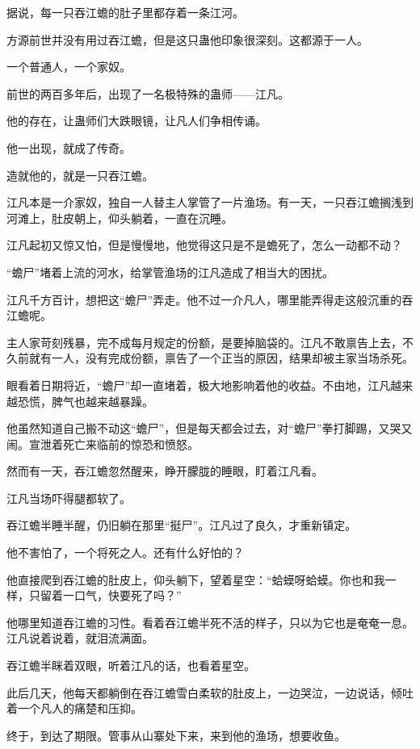 
\begin{this_body}

据说，每一只吞江蟾的肚子里都存着一条江河。

方源前世并没有用过吞江蟾，但是这只蛊他印象很深刻。这都源于一人。

一个普通人，一个家奴。

前世的两百多年后，出现了一名极特殊的蛊师——江凡。

他的存在，让蛊师们大跌眼镜，让凡人们争相传诵。

他一出现，就成了传奇。

造就他的，就是一只吞江蟾。

江凡本是一介家奴，独自一人替主人掌管了一片渔场。有一天，一只吞江蟾搁浅到河滩上，肚皮朝上，仰头躺着，一直在沉睡。

江凡起初又惊又怕，但是慢慢地，他觉得这只是不是蟾死了，怎么一动都不动？

“蟾尸”堵着上流的河水，给掌管渔场的江凡造成了相当大的困扰。

江凡千方百计，想把这“蟾尸”弄走。他不过一介凡人，哪里能弄得走这般沉重的吞江蟾呢。

主人家苛刻残暴，完不成每月规定的份额，是要掉脑袋的。江凡不敢禀告上去，不久前就有一人，没有完成份额，禀告了一个正当的原因，结果却被主家当场杀死。

眼看着日期将近，“蟾尸”却一直堵着，极大地影响着他的收益。不由地，江凡越来越恐慌，脾气也越来越暴躁。

他虽然知道自己搬不动这“蟾尸”，但是每天都会过去，对“蟾尸”拳打脚踢，又哭又闹。宣泄着死亡来临前的惊恐和愤怒。

然而有一天，吞江蟾忽然醒来，睁开朦胧的睡眼，盯着江凡看。

江凡当场吓得腿都软了。

吞江蟾半睡半醒，仍旧躺在那里“挺尸”。江凡过了良久，才重新镇定。

他不害怕了，一个将死之人。还有什么好怕的？

他直接爬到吞江蟾的肚皮上，仰头躺下，望着星空：“蛤蟆呀蛤蟆。你也和我一样，只留着一口气，快要死了吗？”

他哪里知道吞江蟾的习性。看着吞江蟾半死不活的样子，只以为它也是奄奄一息。江凡说着说着，就泪流满面。

吞江蟾半眯着双眼，听着江凡的话，也看着星空。

此后几天，他每天都躺倒在吞江蟾雪白柔软的肚皮上，一边哭泣，一边说话，倾吐着一个凡人的痛楚和压抑。

终于，到达了期限。管事从山寨处下来，来到他的渔场，想要收鱼。


\end{this_body}
